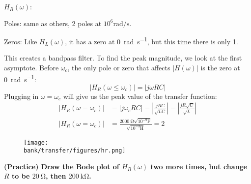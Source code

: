 \begin{enumerate}
{$H_R(\omega)$:

Poles: same as others, 2 poles at $10^6 \si{\radian\per\second}$.

Zeros: Like $H_L(\omega)$, it has a zero at \SI{0}{\radian\per\second}, but this time there is only 1.

This creates a bandpass filter. To find the peak magnitude, we look at the first asymptote. Before $\omega_c$, the only pole or zero that affects $|H(\omega)|$ is the zero at \SI{0}{\radian\per\second}:
\[|H_{R}(\omega \leq \omega_c)|= |j\omega RC|\]
Plugging in $\omega=\omega_c$ will give us the peak value of the transfer function:
\begin{align*}
|H_{R}(\omega = \omega_c)|&= |j\omega_c RC|=\left|\frac{jRC}{\sqrt{LC}}\right| = \left|\frac{jR\sqrt{C}}{\sqrt{L}}\right| \\
 |H_{R}(\omega = \omega_c)|&= \frac{\SI{2000}{\ohm}\sqrt{10^{-9}\si{\farad}}}{\sqrt{10^{-3}\si{\henry}}} = 2
\end{align*}

   \begin{figure}[H]\centering
   \texttt{[image: \\bank/transfer/figures/hr.png]}
   \end{figure}
  
}

\qitem \textbf{(Practice) Draw the Bode plot of $H_R(\omega)$ two more times, but change $R$ to be $\SI{20}{\ohm}$, then $\SI{200}{\kilo\ohm}$.}

\end{enumerate}
